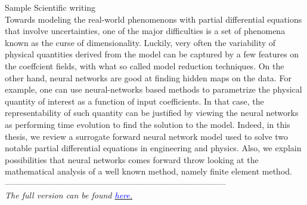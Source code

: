 \begin{cSection}{Sample Scientific writing}
	\\
	\vspace*{1em}
	\small
	Towards modeling the real-world phenomenons with partial differential equations
	that involve uncertainties, one of the major difficulties is a set of phenomena known
	as the curse of dimensionality. Luckily, very often the variability of physical quantities
	derived from the model can be captured by a few features on the coeffcient fields, with
	what so called model reduction techniques. On the other hand, neural networks are
	good at finding hidden maps on the data. For example, one can use neural-networks
	based methods to parametrize the physical quantity of interest as a function of input
	coefficients. In that case, the representability of such quantity can be justified by viewing 
	the neural networks as performing time evolution to find the solution to the model.
	Indeed, in this thesis, we review a surrogate forward neural network model used to solve
	two notable partial differential equations in engineering and physics. Also, we explain
	possibilities that neural networks comes forward throw looking at the mathematical
	analysis of a well known method, namely finite element method.
	\normalsize
	--------------------------------------------------------------------------------\\
	\tiny\textit{
		\scriptsize The full version can be found \href{
			https://github.com/sajed-zarrinpour/My-Academic-Archive/blob/master/Iran/IASBS-MSc/MSc%
		}{\textcolor{blue}{here}.
	}}
	\normalsize
\end{cSection}


